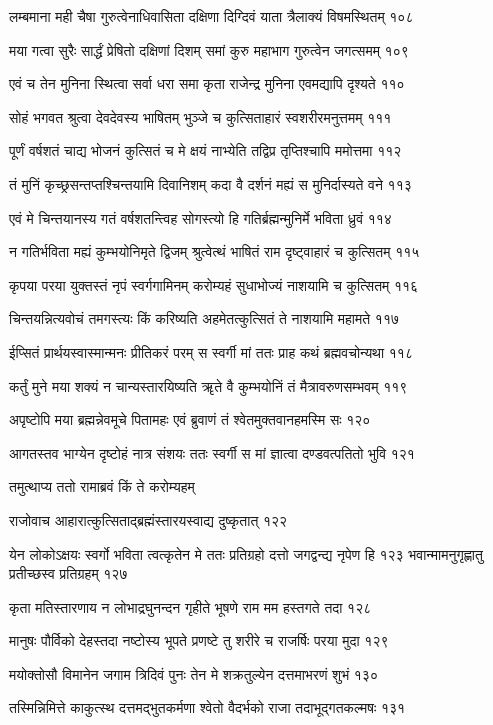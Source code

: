 लम्बमाना मही चैषा गुरुत्वेनाधिवासिता
दक्षिणा दिग्दिवं याता त्रैलाक्यं विषमस्थितम् १०८

मया गत्वा सुरैः सार्द्धं प्रेषितो दक्षिणां दिशम्
समां कुरु महाभाग गुरुत्वेन जगत्समम् १०९

एवं च तेन मुनिना स्थित्वा सर्वा धरा समा
कृता राजेन्द्र मुनिना एवमद्यापि दृश्यते ११०

सोहं भगवत श्रुत्वा देवदेवस्य भाषितम्
भुञ्जे च कुत्सिताहारं स्वशरीरमनुत्तमम् १११

पूर्णं वर्षशतं चाद्य भोजनं कुत्सितं च मे
क्षयं नाभ्येति तद्विप्र तृप्तिश्चापि ममोत्तमा ११२

तं मुनिं कृच्छ्रसन्तप्तश्चिन्तयामि दिवानिशम्
कदा वै दर्शनं मह्यं स मुनिर्दास्यते वने ११३

एवं मे चिन्तयानस्य गतं वर्षशतन्त्विह
सोगस्त्यो हि गतिर्ब्रह्मन्मुनिर्मे भविता ध्रुवं ११४

न गतिर्भविता मह्यं कुम्भयोनिमृते द्विजम्
श्रुत्वेत्थं भाषितं राम दृष्ट्वाहारं च कुत्सितम् ११५

कृपया परया युक्तस्तं नृपं स्वर्गगामिनम्
करोम्यहं सुधाभोज्यं नाशयामि च कुत्सितम् ११६

चिन्तयन्नित्यवोचं तमगस्त्यः किं करिष्यति
अहमेतत्कुत्सितं ते नाशयामि महामते ११७

ईप्सितं प्रार्थयस्वास्मान्मनः प्रीतिकरं परम्
स स्वर्गी मां ततः प्राह कथं ब्रह्मवचोन्यथा ११८

कर्तुं मुने मया शक्यं न चान्यस्तारयिष्यति
ॠते वै कुम्भयोनिं तं मैत्रावरुणसम्भवम् ११९

अपृष्टोपि मया ब्रह्मन्नेवमूचे पितामहः
एवं ब्रुवाणं तं श्वेतमुक्तवानहमस्मि सः १२०

आगतस्तव भाग्येन दृष्टोहं नात्र संशयः
ततः स्वर्गी स मां ज्ञात्वा दण्डवत्पतितो भुवि १२१

तमुत्थाप्य ततो रामाब्रवं किं ते करोम्यहम्

राजोवाच
आहारात्कुत्सिताद्ब्रह्मंस्तारयस्वाद्य दुष्कृतात् १२२

येन लोकोऽक्षयः स्वर्गो भविता त्वत्कृतेन मे
ततः प्रतिग्रहो दत्तो जगद्वन्द्य नृपेण हि १२३
भवान्मामनुगृह्णातु प्रतीच्छस्व प्रतिग्रहम् १२७

कृता मतिस्तारणाय न लोभाद्रघुनन्दन
गृहीते भूषणे राम मम हस्तगते तदा १२८

मानुषः पौर्विको देहस्तदा नष्टोस्य भूपते
प्रणष्टे तु शरीरे च राजर्षिः परया मुदा १२९

मयोक्तोसौ विमानेन जगाम त्रिदिवं पुनः
तेन मे शक्रतुल्येन दत्तमाभरणं शुभं १३०

तस्मिन्निमित्ते काकुत्स्थ दत्तमद्भुतकर्मणा
श्वेतो वैदर्भको राजा तदाभूद्गतकल्मषः १३१

